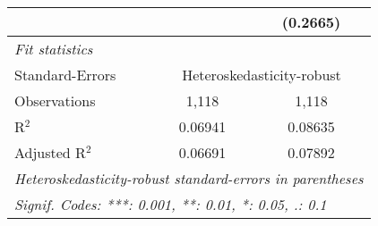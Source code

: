 \begin{tabular}{lcc}
                                         &                & (0.2665)\\   
   \midrule
   \emph{Fit statistics}\\
   Standard-Errors & \multicolumn{2}{c}{Heteroskedasticity-robust} \\ 
   Observations                          & 1,118          & 1,118\\  
   R$^2$                                 & 0.06941        & 0.08635\\  
   Adjusted R$^2$                        & 0.06691        & 0.07892\\  
   \midrule \midrule
   \multicolumn{3}{l}{\emph{Heteroskedasticity-robust standard-errors in parentheses}}\\
   \multicolumn{3}{l}{\emph{Signif. Codes: ***: 0.001, **: 0.01, *: 0.05, .: 0.1}}\\
\end{tabular}
\par\endgroup



